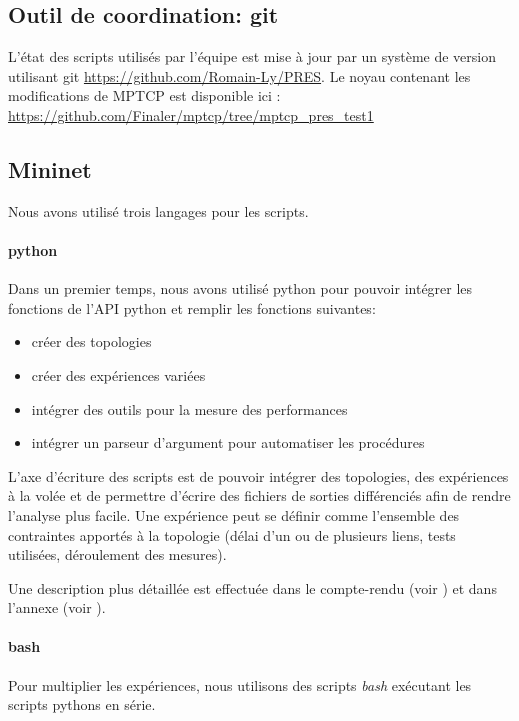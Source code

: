 
\subsection[Outil de coordination: git]{Outil de coordination: git}
\label{subsec:conception2:git}
L'état des scripts utilisés par l'équipe est mise à jour par un
système de version utilisant git
\url{https://github.com/Romain-Ly/PRES}. Le noyau contenant les
modifications de MPTCP est disponible ici :
\url{https://github.com/Finaler/mptcp/tree/mptcp_pres_test1}


\subsection{Mininet}
\label{sec:conce:Mininet}

Nous avons utilisé trois langages pour les scripts.

\paragraph{python}
Dans un premier temps, nous avons utilisé python pour pouvoir intégrer
les fonctions de l'API python et remplir les fonctions suivantes:
\begin{itemize}
\item créer des topologies
\item créer des expériences variées
\item intégrer des outils pour la mesure des performances
\item intégrer un parseur d'argument pour automatiser les procédures
\end{itemize}

L'axe d'écriture des scripts est de pouvoir intégrer des topologies,
des expériences à la volée et de permettre d'écrire des fichiers de
sorties différenciés afin de rendre l'analyse plus facile. Une
expérience peut se définir comme l'ensemble des contraintes apportés à
la topologie (délai d'un ou de plusieurs liens, tests utilisées,
déroulement des mesures).

Une description plus détaillée est effectuée dans le compte-rendu (voir
) et dans l'annexe (voir ).

\paragraph{bash}
Pour multiplier les expériences, nous utilisons des scripts
\emph{bash} exécutant les scripts pythons en série.

